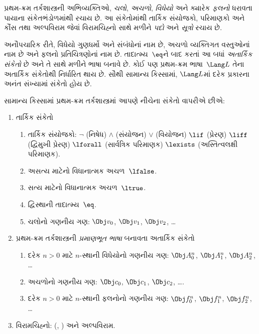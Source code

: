 \begingroup
\makeatletter{}\makeatother


\label{guunit:OLP-0151}



પ્રથમ-ક્રમ તર્કશાસ્ત્રની અભિવ્યક્તિઓ, \emph{ચલો},
\emph{અચળો}, \emph{વિધેયો} અને ક્યારેક
\emph{ફલનો} ધરાવતા પાયાના સંકેતભંડોળમાંથી રચાય છે. આ
સંકેતોમાંથી તાર્કિક સંયોજકો, પરિમાણકો અને કૌંસ તથા અલ્પવિરામ જેવાં
વિરામચિહ્નો સાથે મળીને \emph{પદો} અને \emph{સૂત્રો} રચાય છે.

\begin{explain}
અનૌપચારિક રીતે, વિધેયો ગુણધર્મો અને સંબંધોનાં નામ છે,
અચળો વ્યક્તિગત વસ્તુઓનાં નામ છે અને ફલનો
પ્રતિચિત્રણોનાં નામ છે. તાદાત્મ્ય~$\eq$ને બાદ કરતાં આ બધાં
\emph{અતાર્કિક સંકેતો} છે અને તે સાથે મળીને ભાષા બનાવે છે. કોઈ પણ
પ્રથમ-ક્રમ ભાષા~$\Lang L$ તેના અતાર્કિક સંકેતોથી નિર્ધારિત થાય છે.
સૌથી સામાન્ય કિસ્સામાં, $\Lang L$માં દરેક પ્રકારના અનંત સંખ્યામાં
સંકેતો હોય છે.
\end{explain}

સામાન્ય કિસ્સામાં પ્રથમ-ક્રમ તર્કશાસ્ત્રમાં આપણે નીચેના સંકેતો
વાપરીએ છીએ:

\begin{enumerate}
\item તાર્કિક સંકેતો
\begin{enumerate}
\item તાર્કિક સંયોજકો:
  \startycommalist
  \ycomma $\lnot$ (નિષેધ)%
  \ycomma $\land$ (સંયોજન)%
  \ycomma $\lor$ (વિયોજન)%
  \ycomma $\lif$ (પ્રેરણ)%
  \ycomma $\liff$ (દ્વિમુખી પ્રેરણ)%
  \ycomma $\lforall$ (સાર્વત્રિક પરિમાણક)%
  \ycomma $\lexists$ (અસ્તિત્વલક્ષી પરિમાણક).
\item અસત્ય માટેનો વિધાનાત્મક અચળ~$\lfalse$.
\item સત્ય માટેનો વિધાનાત્મક અચળ~$\ltrue$.
\item દ્વિસ્થાની તાદાત્મ્ય~$\eq$.
\item ચલોનો ગણનીય ગણ: $\Obj v_0$, $\Obj v_1$,
  $\Obj v_2$, \dots
\end{enumerate}
\item પ્રથમ-ક્રમ તર્કશાસ્ત્રની \emph{પ્રમાણભૂત ભાષા} બનાવતા
  અતાર્કિક સંકેતો
\begin{enumerate}
\item દરેક $n>0$ માટે $n$-સ્થાની વિધેયોનો ગણનીય
  ગણ: $\Obj A^n_0$, $\Obj A^n_1$, $\Obj A^n_2$, \dots
\item અચળોનો ગણનીય ગણ: $\Obj c_0$, $\Obj c_1$,
  $\Obj c_2$, \dots.
\item દરેક $n>0$ માટે $n$-સ્થાની ફલનોનો ગણનીય
  ગણ: $\Obj f^n_0$, $\Obj f^n_1$, $\Obj f^n_2$, \dots
\end{enumerate}
\item વિરામચિહ્નો: (, ) અને અલ્પવિરામ.
\end{enumerate}

